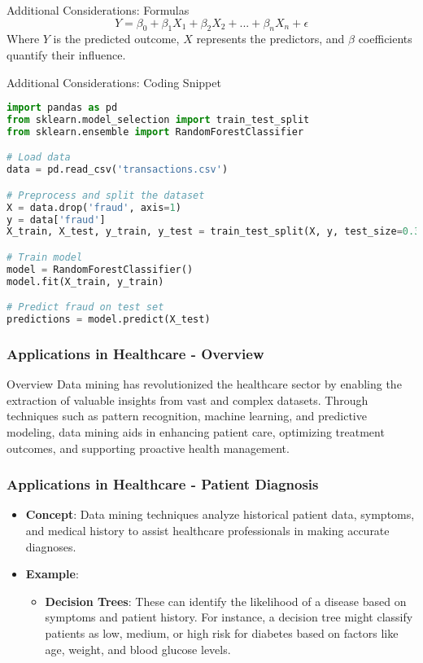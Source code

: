 \documentclass[aspectratio=169]{beamer}
\begin{document}
\begin{frame}[fragile]{Additional Considerations: Formulas}
    \begin{equation}
    Y = \beta_0 + \beta_1X_1 + \beta_2X_2 + ... + \beta_nX_n + \epsilon 
    \end{equation}
    Where \(Y\) is the predicted outcome, \(X\) represents the predictors, and \(\beta\) coefficients quantify their influence.
\end{frame}

\begin{frame}[fragile]{Additional Considerations: Coding Snippet}
    \begin{lstlisting}[language=Python]
import pandas as pd
from sklearn.model_selection import train_test_split
from sklearn.ensemble import RandomForestClassifier

# Load data
data = pd.read_csv('transactions.csv')

# Preprocess and split the dataset
X = data.drop('fraud', axis=1)
y = data['fraud']
X_train, X_test, y_train, y_test = train_test_split(X, y, test_size=0.3)

# Train model
model = RandomForestClassifier()
model.fit(X_train, y_train)

# Predict fraud on test set
predictions = model.predict(X_test)
    \end{lstlisting}
\end{frame}

\begin{frame}[fragile]
    \frametitle{Applications in Healthcare - Overview}
    \begin{block}{Overview}
        Data mining has revolutionized the healthcare sector by enabling the extraction of valuable insights from vast and complex datasets. 
        Through techniques such as pattern recognition, machine learning, and predictive modeling, data mining aids in enhancing patient care, optimizing treatment outcomes, and supporting proactive health management.
    \end{block}
\end{frame}

\begin{frame}[fragile]
    \frametitle{Applications in Healthcare - Patient Diagnosis}
    \begin{itemize}
        \item \textbf{Concept}: Data mining techniques analyze historical patient data, symptoms, and medical history to assist healthcare professionals in making accurate diagnoses.
        \item \textbf{Example}: 
        \begin{itemize}
            \item \textbf{Decision Trees}: These can identify the likelihood of a disease based on symptoms and patient history. For instance, a decision tree might classify patients as low, medium, or high risk for diabetes based on factors like age, weight, and blood glucose levels.
        \end{itemize}
    \end{itemize}
\end{frame}
\end{document}
